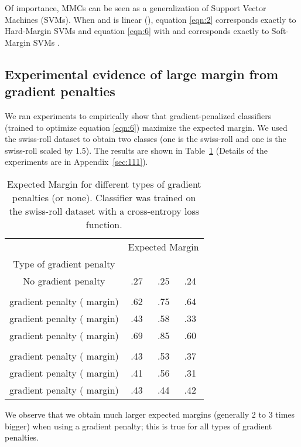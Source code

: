 \documentclass{article}
\begin{document}
Of importance, MMCs can be seen as a generalization of Support Vector Machines (SVMs). When  and  is linear (), equation \ref{eqn:2} corresponds exactly to Hard-Margin SVMs and equation \ref{eqn:6} with  and  corresponds exactly to Soft-Margin SVMs \citep{cortes1995support}.

\subsection{Experimental evidence of large margin from gradient penalties}

We ran experiments to empirically show that gradient-penalized classifiers (trained to optimize equation \ref{eqn:6}) maximize the expected margin. We used the swiss-roll dataset \citep{marsland2015machine} to obtain two classes (one is the swiss-roll and one is the swiss-roll scaled by 1.5).  The results are shown in Table~\ref{tab:9} (Details of the experiments are in Appendix~\ref{sec:111}).

\begin{table}[!ht]
	\caption{Expected  Margin for different types of gradient penalties (or none). Classifier was trained on the swiss-roll dataset with a cross-entropy loss function.}
	\label{tab:9}
	\centering
	\begin{tabular}{cccc}
		\toprule
		& \multicolumn{3}{c}{Expected  Margin} \\
		Type of gradient penalty &  &  &  \\
		\cmidrule(){1-4}
		No gradient penalty & .27 & .25 & .24 \\
		\cmidrule(){1-4}
		 \\
		\cmidrule(){1-4}
         gradient penalty ( margin) & .62 & .75 & .64 \\
         gradient penalty ( margin) & .43 & .58 & .33 \\
         gradient penalty ( margin) & .69 & .85 & .60 \\
        \cmidrule(){1-4}
         \\
        \cmidrule(){1-4}
         gradient penalty ( margin) & .43 & .53 & .37 \\
         gradient penalty ( margin) & .41 & .56 & .31 \\
         gradient penalty ( margin) & .43 & .44 & .42 \\
		\bottomrule
	\end{tabular}
\end{table}

We observe that we obtain much larger expected margins (generally 2 to 3 times bigger) when using a gradient penalty; this is true for all types of gradient penalties.
\end{document}
